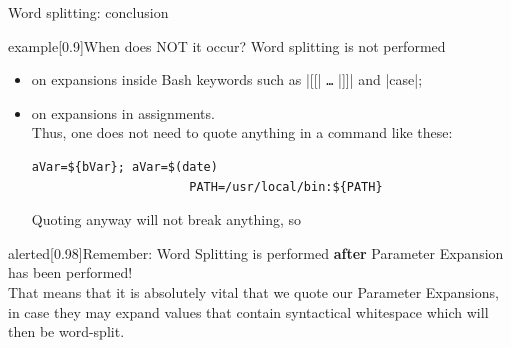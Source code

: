 \begin{frame}[fragile]{Word splitting: conclusion}
    \vspace{-2mm}
        \begin{varblock*}{example}[0.9\textwidth]{When does NOT it occur?}
        Word splitting is not performed
        \begin{itemize}
            \item on expansions inside Bash keywords such as \bash|[[| \texttt{\ldots} \bash|]]| and \bash|case|;
            \item on expansions in assignments. \\[0.3em] Thus, one does not need to quote anything in a command like these:
                  \begin{lstlisting}[style=MyBash, numbers=none, xrightmargin=45mm, belowskip=-5mm, aboveskip=2mm]
                      aVar=${bVar}; aVar=$(date)
                      PATH=/usr/local/bin:${PATH}
                  \end{lstlisting}
                  Quoting anyway will not break anything, so 
        \end{itemize}
    \end{varblock*}
    \begin{varblock}{alerted}[0.98\textwidth]{Remember:}
        \alert{Word Splitting is performed \textbf{after} Parameter Expansion has been performed!} \\
        That means that it is absolutely vital that we quote our Parameter Expansions, in case they may expand values that contain syntactical whitespace which will then be word-split.
    \end{varblock}
\end{frame}
